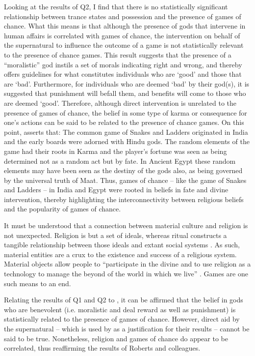 \documentclass[%
	]{ijsra}
\begin{document}
Looking at the results of Q2, I find that there is no statistically significant relationship between trance states and possession and the presence of games of chance. What this means is that although the presence of gods that intervene in human affairs is correlated with games of chance, the intervention on behalf of the supernatural to influence the outcome of a game is not statistically relevant to the presence of chance games. This result suggests that the presence of a ``moralistic” god instils a set of morals indicating right and wrong, and thereby offers guidelines for what constitutes individuals who are ‘good’ and those that are ‘bad’. Furthermore, for individuals who are deemed ‘bad’ by their god(s), it is suggested that punishment will befall them, and benefits will come to those who are deemed ‘good’. Therefore, although direct intervention is unrelated to the presence of games of chance, the belief in some type of karma or consequence for one’s actions can be said to be related to the presence of chance games. On this point, \textcite{robinson2015} asserts that:
The common game of Snakes and Ladders originated in India and the early boards were adorned with Hindu gods. The random elements of the game had their roots in Karma and the player's fortune was seen as being determined not as a random act but by fate. In Ancient Egypt these random elements may have been seen as the destiny of the gods also, as being governed by the universal truth of Maat.
Thus, games of chance – like the game of Snakes and Ladders – in India and Egypt were rooted in beliefs in fate and divine intervention, thereby highlighting the interconnectivity between religious beliefs and the popularity of games of chance.

It must be understood that a connection between material culture and religion is not unexpected. Religion is but a set of ideals, whereas ritual constructs a tangible relationship between those ideals and extant social systems \parencite[14]{bell1992}. As such, material entities are a crux to the existence and success of a religious system. Material objects allow people to ``participate in the divine and to use religion as a technology to manage the beyond of the world in which we live” \parencite[99]{hodder2016}. Games are one such means to an end. 

Relating the results of Q1 and Q2 to \textcite{roberts1959}, it can be affirmed that the belief in gods who are benevolent (i.e. moralistic and deal reward as well as punishment) is statistically related to the presence of games of chance. However, direct aid by the supernatural – which is used by \textcite[602]{roberts1959} as a justification for their results – cannot be said to be true. Nonetheless, religion and games of chance do appear to be correlated, thus reaffirming the results of Roberts and colleagues.
\end{document}
